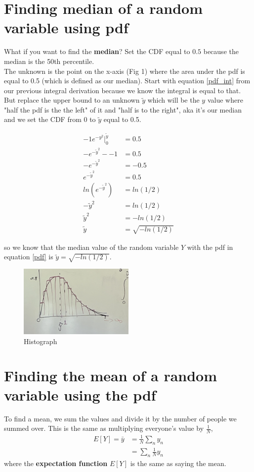 \documentclass{article}
\begin{document}
\section{Finding median of a random variable using pdf}
What if you want to find the \textbf{median}? Set the CDF equal to $0.5$ because the median is the 50th percentile. \\

The unknown is the point on the x-axis (Fig 1) where the area under the pdf is equal to 0.5 (which is defined as our median). Start with equation \ref{pdf_int} from our previous integral derivation because we know the integral is equal to that. But replace the upper bound to an unknown $\tilde{y}$ which will be the $y$ value where "half the pdf is the the left" of it and "half is to the right", aka it's our median and we set the CDF from 0 to $\tilde y$ equal to 0.5.

\begin{align}
    -1 e^{-y^2} \bigg |_0^{\tilde {y}} &= 0.5\\
    -e^{- \tilde y ^2} - - 1 &= 0. 5\\
    -e^{- \tilde y ^2} &= - 0.5 \\  
    e^{- \tilde y ^2} & = 0.5\\
    ln( e^{- \tilde y ^2}) &= ln(1/2) \\
    - \tilde y^2 &= ln(1/2)  \\
    \tilde y^2 &= - ln(1/2) \\
    \tilde y &= \sqrt{-ln(1/2)}
\end{align}

so we know that the median value of the random variable $Y$ with the pdf in equation \ref{pdf} is $ \tilde y = \sqrt{- ln(1/2)}$.

\begin{figure}[htp]
    \centering
        \includegraphics[width=0.5\textwidth]{Screen Shot 2023-10-09 at 11.11.30 AM.png}
    \caption{Histograph}
\end{figure}

\section{Finding the mean of a random variable using the pdf}
To find a mean, we sum the values and divide it by the number of people we summed over. This is the same as multiplying everyone's value by $\frac{1}{N}$, 
\begin{align}
   E[Y]= \bar y &= \frac{1}{N}\sum_n y_n\\
   &= \sum_n \frac{1}{N} y_n
\end{align}
where the \textbf{expectation function} $E[Y]$ is the same as saying the mean. \\
\end{document}
